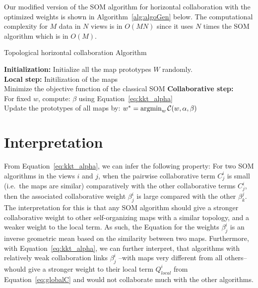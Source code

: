 \medskip
Our modified version of the SOM algorithm for horizontal collaboration with the optimized weights is shown in Algorithm~\ref{alg:algoGen} below. The computational complexity for $M$ data in $N$ views is in $O(MN)$ since it uses $N$ times the SOM algorithm which is in $O(M)$.

\begin{algorithm}[!h]
\label{alg:algoGen}
\SetAlgoLined{}
	\vspace{0.05cm}
	\caption{Topological horizontal collaboration Algorithm}
	\vspace{0.05cm}
	\textbf{Initialization:} Initialize all the map prototypes $W$ randomly. \\
	\textbf{Local step:} Initilization of the maps\\
	 {
		Minimize the objective function of the classical SOM
	} 
	\textbf{Collaborative step:}\\
	 {
		For fixed $w$, compute:
		$\beta$ using Equation~\eqref{eq:kkt_alpha} \\	 
		Update the prototypes of all maps by: 
		$ 
		w^{*} =  \operatornamewithlimits{argmin}_{w}\mathcal{C}(w,\alpha,\beta) 
		$
	}	 
\end{algorithm}

\section{Interpretation}
\label{sec:interpretation}

From Equation~\eqref{eq:kkt_alpha}, we can infer the following property: For two SOM algorithms in the views $i$ and $j$, when the pairwise collaborative term $C_j^i$ is small (i.e.\ the maps are similar) comparatively with the other collaborative terms $C_j^i$, then the associated collaborative weight $\beta_j^i$ is large compared with the other $\beta_k^j$. The interpretation for this is that any SOM algorithm should give a stronger collaborative weight to other self-organizing maps with a similar topology, and a weaker weight to the local term. As such, the Equation for the weights $\beta_j^i$ is an inverse geometric mean based on the similarity between two maps. 
Furthermore, with Equation~\eqref{eq:kkt_alpha}, we can further interpret, that algorithms with relatively weak collaboration links $\beta_j^i$ --with maps very different from all others-- whould give a stronger weight to their local term $Q^i_{local}$ from Equation~\eqref{eq:globalC} and would not collaborate much with the other algorithms. 

